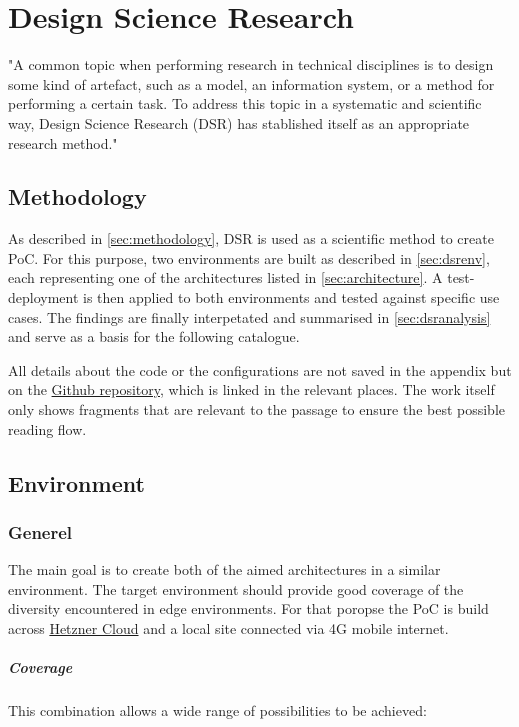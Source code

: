 \documentclass[MSC,Master,english]{twbook}%
\begin{document}
\chapter{Design Science Research}
\label{chap:dsr}
"A common topic when performing research in technical disciplines is to design some kind of artefact, such as a model, an information system, or a method for performing a certain task. To address this topic in a systematic and scientific way, Design Science Research (DSR) has stablished itself as an appropriate research method." \cite{dsr-method}

\section{Methodology}
\label{sec:dsrmethode}
As described in \autoref{sec:methodology}, \ac{DSR} is used as a scientific method to create \ac{PoC}. For this purpose, two environments are built as described in \autoref{sec:dsrenv}, each representing one of the architectures listed in \autoref{sec:architecture}. A test-deployment is then applied to both environments and tested against specific use cases. The findings are finally interpetated and summarised in \autoref{sec:dsranalysis} and serve as a basis for the following catalogue.\par

All details about the code or the configurations are not saved in the appendix but on the \hyperref{https://github.com/Berndinox/K8sEdge}{}{}{Github repository}, which is linked in the relevant places. The work itself only shows fragments that are relevant to the passage to ensure the best possible reading flow.

\section{Environment}
\label{sec:dsrenv}
\subsection{Generel}
The main goal is to create both of the aimed architectures in a similar environment. The target environment should provide good coverage of the diversity encountered in edge environments. For that poropse the \ac{PoC} is build across \hyperref{https://www.hetzner.com/cloud}{}{}{Hetzner Cloud} and a local site connected via 4G mobile internet.

\paragraph{Coverage} This combination allows a wide range of possibilities to be achieved:
\end{document}
